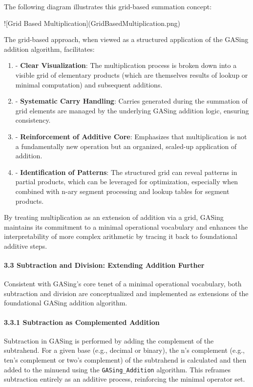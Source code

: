 The following diagram illustrates this grid-based summation concept:

![Grid Based Multiplication](GridBasedMultiplication.png)

The grid-based approach, when viewed as a structured application of the GASing addition algorithm, facilitates:

\begin{enumerate}
  \item - \textbf{Clear Visualization}: The multiplication process is broken down into a visible grid of elementary products (which are themselves results of lookup or minimal computation) and subsequent additions.
  \item - \textbf{Systematic Carry Handling}: Carries generated during the summation of grid elements are managed by the underlying GASing addition logic, ensuring consistency.
  \item - \textbf{Reinforcement of Additive Core}: Emphasizes that multiplication is not a fundamentally new operation but an organized, scaled-up application of addition.
  \item - \textbf{Identification of Patterns}: The structured grid can reveal patterns in partial products, which can be leveraged for optimization, especially when combined with n-ary segment processing and lookup tables for segment products.
\end{enumerate}

By treating multiplication as an extension of addition via a grid, GASing maintains its commitment to a minimal operational vocabulary and enhances the interpretability of more complex arithmetic by tracing it back to foundational additive steps.

\paragraph{3.3 Subtraction and Division: Extending Addition Further}
Consistent with GASing's core tenet of a minimal operational vocabulary, both subtraction and division are conceptualized and implemented as extensions of the foundational GASing addition algorithm.

\paragraph{3.3.1 Subtraction as Complemented Addition}
Subtraction in GASing is performed by adding the complement of the subtrahend. For a given base (e.g., decimal or binary), the n's complement (e.g., ten's complement or two's complement) of the subtrahend is calculated and then added to the minuend using the \texttt{GASing_Addition} algorithm. This reframes subtraction entirely as an additive process, reinforcing the minimal operator set.

